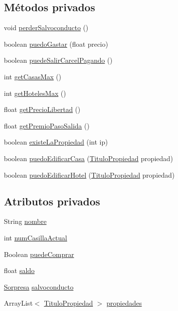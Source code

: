 \subsection*{Métodos privados}
\begin{DoxyCompactItemize}
\item 
void \hyperlink{classcivitas_1_1Jugador_a121e27109e4f746fd129175b1622c154}{perder\+Salvoconducto} ()
\item 
boolean \hyperlink{classcivitas_1_1Jugador_a459494b841c3ac2c9d93b00307292d89}{puedo\+Gastar} (float precio)
\item 
boolean \hyperlink{classcivitas_1_1Jugador_a4a001e328396bc37afa704a71a0f236f}{puede\+Salir\+Carcel\+Pagando} ()
\item 
int \hyperlink{classcivitas_1_1Jugador_a53bb212c80e5478ee456aac4e80c3aca}{get\+Casas\+Max} ()
\item 
int \hyperlink{classcivitas_1_1Jugador_adcb057e3337f0c727184071a8b8374f8}{get\+Hoteles\+Max} ()
\item 
float \hyperlink{classcivitas_1_1Jugador_a7efefdcbd0fc0d10e113a605c0251e2b}{get\+Precio\+Libertad} ()
\item 
float \hyperlink{classcivitas_1_1Jugador_a2640c1b6ddf6f07a2d11012b51f05910}{get\+Premio\+Paso\+Salida} ()
\item 
boolean \hyperlink{classcivitas_1_1Jugador_a5ae51ea0cc7dd26a7db41fe6cd96dd87}{existe\+La\+Propiedad} (int ip)
\item 
boolean \hyperlink{classcivitas_1_1Jugador_a471ecc3440579578a91e2eb5cf3a7acc}{puedo\+Edificar\+Casa} (\hyperlink{classcivitas_1_1TituloPropiedad}{Titulo\+Propiedad} propiedad)
\item 
boolean \hyperlink{classcivitas_1_1Jugador_ab5a6f51daa7036633cfba1f68b653228}{puedo\+Edificar\+Hotel} (\hyperlink{classcivitas_1_1TituloPropiedad}{Titulo\+Propiedad} propiedad)
\end{DoxyCompactItemize}
\subsection*{Atributos privados}
\begin{DoxyCompactItemize}
\item 
String \hyperlink{classcivitas_1_1Jugador_a15303963c4d14ce30464ed4fd4d89e01}{nombre}
\item 
int \hyperlink{classcivitas_1_1Jugador_ae8c1f9b2e7645e174f1e774ae0322528}{num\+Casilla\+Actual}
\item 
Boolean \hyperlink{classcivitas_1_1Jugador_a0623b0de7503538559075f1b89e8c2d7}{puede\+Comprar}
\item 
float \hyperlink{classcivitas_1_1Jugador_a5af09f8e331ff80dd432f89a3024c5ec}{saldo}
\item 
\hyperlink{classcivitas_1_1Sorpresa}{Sorpresa} \hyperlink{classcivitas_1_1Jugador_ad5cc928f36c930703bec36ee0be85132}{salvoconducto}
\item 
Array\+List$<$ \hyperlink{classcivitas_1_1TituloPropiedad}{Titulo\+Propiedad} $>$ \hyperlink{classcivitas_1_1Jugador_a037fa4dda1033ad869d6a9b61feb00af}{propiedades}
\end{DoxyCompactItemize}
